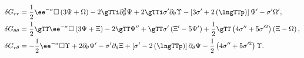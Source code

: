 \begin{equation}
\begin{aligned}
\delta G_{rr} & = \frac{1}{2} \ee^{-\sigma} \Box\left(3 \Psi +
\Omega\right) - 2 \gTTi \partial_\theta^2 \Psi + 2 \gTTi \sigma'
\partial_\theta \Upsilon - \left[3 \sigma' + 2 \left(\lngTTp \right)
\right] \Psi' - \sigma' \Omega',\\
\delta G_{\theta \theta} & = \frac{1}{2} \gTT \ee^{-\sigma} \Box
\left(3 \Psi + \Xi \right) - 2 \gTT \Psi'' + \gTT \sigma'
\left(\Xi' - 5 \Psi' \right) + \frac{1}{2} \gTT \left(4 \sigma'' + 5
\sigma'^2 \right) \left( \Xi - \Omega \right),\\
\delta G_{r \theta} & = -\frac{1}{2} \ee^{-\sigma} \Box \Upsilon +
2 \partial_\theta \Psi' - \sigma' \partial_\theta \Xi + \left[\sigma'
  - 2 \left(\lngTTp\right) \right] \partial_\theta \Psi -\frac{1}{2}
\left(4 \sigma'' + 5 \sigma'^2 \right) \Upsilon.
\end{aligned}
\end{equation}

